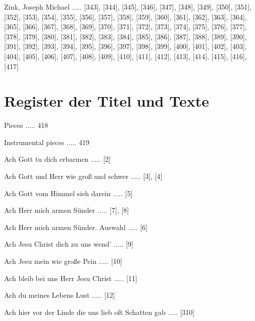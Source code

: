 \documentclass[twocolumn, 12pt]{book}
\begin{document}
\newline 
Zink, Joseph Michael ..... [343], [344], [345], [346], [347], [348], [349], [350], [351], [352], [353], [354], [355], [356], [357], [358], [359], [360], [361], [362], [363], [364], [365], [366], [367], [368], [369], [370], [371], [372], [373], [374], [375], [376], [377], [378], [379], [380], [381], [382], [383], [384], [385], [386], [387], [388], [389], [390], [391], [392], [393], [394], [395], [396], [397], [398], [399], [400], [401], [402], [403], [404], [405], [406], [407], [408], [409], [410], [411], [412], [413], [414], [415], [416], [417]
    \clearpage  
    \chapter*{\centering Register der Titel und Texte}
\fancyhead{}


 Pieces ..... 418

 Instrumental pieces ..... 419

\newline 
Ach Gott tu dich erbarmen ..... [2]

\newline 
Ach Gott und Herr wie groß und schwer ..... [3], [4]

\newline 
Ach Gott vom Himmel sieh darein ..... [5]

\newline 
Ach Herr mich armen Sünder ..... [7], [8]

\newline 
Ach Herr mich armen Sünder. Auswahl ..... [6]

\newline 
Ach Jesu Christ dich zu uns wend' ..... [9]

\newline 
Ach Jesu mein wie große Pein ..... [10]

\newline 
Ach bleib bei uns Herr Jesu Christ ..... [11]

\newline 
Ach du meines Lebens Lust ..... [12]

\newline 
Ach hier vor der Linde die uns lieb oft Schatten gab ..... [310]
\end{document}
